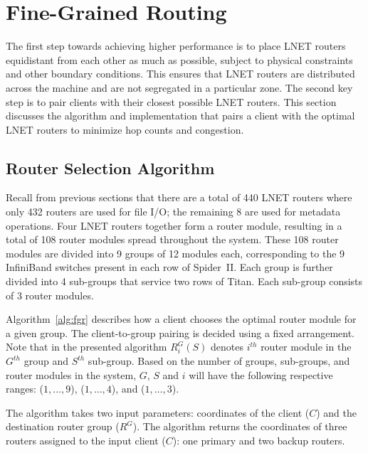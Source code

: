 \section{Fine-Grained Routing}

The first step towards achieving higher performance is to place LNET routers
equidistant from each other as much as possible, subject to physical
constraints and other boundary conditions. This ensures that LNET routers are
distributed across the machine and are not segregated in a particular zone. The
second key step is to pair clients with their closest possible LNET routers.
This section discusses the algorithm and implementation that pairs a client
with the optimal LNET routers to minimize hop counts and congestion.

\subsection{Router Selection Algorithm}
Recall from previous sections that there are a total of 440 LNET routers where
only 432 routers are used for file I/O; the remaining 8 are used for metadata
operations. Four LNET routers together form a router module, resulting in a
total of 108 router modules spread throughout the system. These 108 router
modules are divided into 9 groups of 12 modules each, corresponding to the 9
InfiniBand switches present in each row of Spider~II.  Each group is further
divided into 4 sub-groups that service two rows of Titan. Each sub-group
consists of 3 router modules.

Algorithm~\ref{alg:fgr} describes how a client chooses the optimal router
module for a given group. The client-to-group pairing is decided using a fixed
arrangement.  Note that in the presented algorithm $R^G_{i}(S)$ denotes
$i^{th}$ router module in the $G^{th}$ group and $S^{th}$ sub-group. Based on
the number of groups, sub-groups, and router modules in the system, $G$, $S$
and $i$ will have the following respective ranges: ($1, \dots, 9$), ($1, \dots,
4$), and ($1, \dots, 3$).


The algorithm takes two input parameters: coordinates of the client ($C$) and
the destination router group ($R^G$). The algorithm returns the coordinates of
three routers assigned to the input client ($C$): one primary and two backup
routers. 

